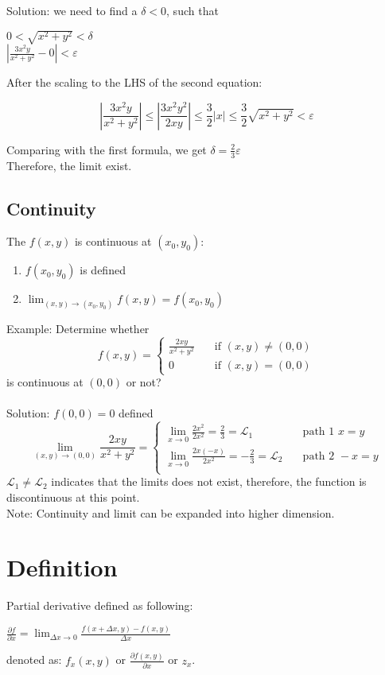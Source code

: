 Solution: we need to find a $\delta <0$, such that
\begin{center}
$0<\sqrt{x^2+y^2}<\delta $\\
$\left|\frac{3x^2y }{x^2+y^2}-0\right|<\varepsilon$
\end{center}
After the scaling to the LHS of the second equation:

\[\left|	\frac{3x^2y }{x^2+y^2}	\right| \leq \left|\frac{3x^2y^2}{2xy}\right| \leq \frac{3}{2}|x| \leq \frac{3}{2}\sqrt{x^2+y^2}<\varepsilon \]

Comparing with the first formula, we get $\delta = \frac{2}{3}\varepsilon$\\
Therefore, the limit exist.
\subsection{Continuity}
The $f(x,y)$ is continuous at $(x_0,y_0)$:
\begin{enumerate}
\item $f(x_0,y_0)$ is defined
\item $\displaystyle\lim_{(x,y)\to (x_0,y_0)}f(x,y)=f(x_0,y_0)$
\end{enumerate}
Example: Determine whether\\
\[f(x,y)=\begin{cases}
\frac{2xy}{x^2+y^2} & \quad \text{if } (x,y)\neq (0,0)\\
0 & \quad \text{if } (x,y)= (0,0)
\end{cases}\]
is continuous at $(0,0)$ or not?\\ \\
Solution: $f(0,0)=0$ defined
\[\displaystyle\lim_{(x,y)\to (0,0)}\frac{2xy}{x^2+y^2}=\begin{cases}
\displaystyle\lim_{x\to 0}\frac{2x^2}{2x^2}=\frac{2}{3}=\mathcal{L}_1 & \quad \text{path 1 } x=y\\
\displaystyle\lim_{x\to 0}\frac{2x(-x)}{2x^2}=-\frac{2}{3}=\mathcal{L}_2 & \quad \text{path 2 } -x=y\\
\end{cases}\]
$\mathcal{L}_1\neq \mathcal{L}_2$ indicates that the limits does not exist, therefore, the function is discontinuous at this point.\\
Note: Continuity and limit can be expanded into higher dimension.

\section{Definition}
Partial derivative defined as following:
\begin{center}
$\frac{\partial f}{\partial x}=\displaystyle\lim_{\Delta x \to 0}\frac{f(x+\Delta x,y)-f(x,y)}{\Delta x}$
\end{center}
denoted as: $f_x(x,y)$ or $\frac{\partial f(x,y)}{\partial x}$ or $z_x$.
